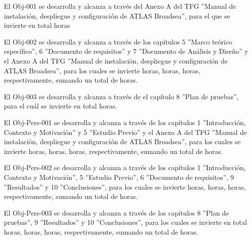 

El Obj-001 se desarrolla y alcanza a través del Anexo A del TFG ''Manual de instalación, despliegue y configuración de ATLAS Broadsea'', para el que se invierte en total {horas} 

El Obj-002 se desarrolla y alcanza a través de los capítulos 5 ''Marco teórico específico'', 6 ''Documento de requisitos'' y 7 ''Documento de Análisis y Diseño'' y el Anexo A del TFG ''Manual de instalación, despliegue y configuración de ATLAS Broadsea'', para los cuales se invierte {horas}, {horas}, {horas}, respectivamente, sumando un total de {horas}.

El Obj-003 se desarrolla y alcanza a través de el capítulo 8 ''Plan de pruebas'', para el cuál se invierte en total {horas}.



El Obj-Pers-001  se desarrolla y alcanza a través de los capítulos 1 ''Introducción, Contexto y Motivación'' y 5 ''Estudio Previo'' y el Anexo A del TFG ''Manual de instalación, despliegue y configuración de ATLAS Broadsea'', para los cuales se invierte {horas}, {horas}, {horas}, respectivamente, sumando un total de {horas}.

El Obj-Pers-002 se desarrolla y alcanza a través de los capítulos 1 ''Introducción, Contexto y Motivación'', 5 ''Estudio Previo'',  6 ''Documento de requisitos'', 9 ''Resultados'' y 10 ''Conclusiones'', para los cuales se invierte {horas}, {horas}, {horas}, respectivamente, sumando un total de {horas}.

El Obj-Pers-003 se desarrolla y alcanza a través de los capítulos  8 ''Plan de pruebas'', 9 ''Resultados'' y 10 ''Conclusiones'', para los cuales se invierte en total {horas}, {horas}, {horas}, respectivamente, sumando un total de {horas}.
